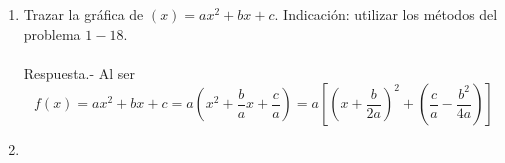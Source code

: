 \begin{enumerate}
    \item Trazar la gráfica de $(x)=ax^2+bx+c$. Indicación: utilizar los métodos del problema $1-18$.\\\\
	Respuesta.-\; Al ser $$f(x)=ax^2+bx+c=a\left( x^2 + \dfrac{b}{a}x + \dfrac{c}{a} \right) = a \left[ \left( x + \dfrac{b}{2a} \right)^2 + \left( \dfrac{c}{a} - \dfrac{b^2}{4a} \right)  \right]$$ 
	\begin{center}
	\end{center}
	\vspace{0.5cm}

    \item

\end{enumerate}
